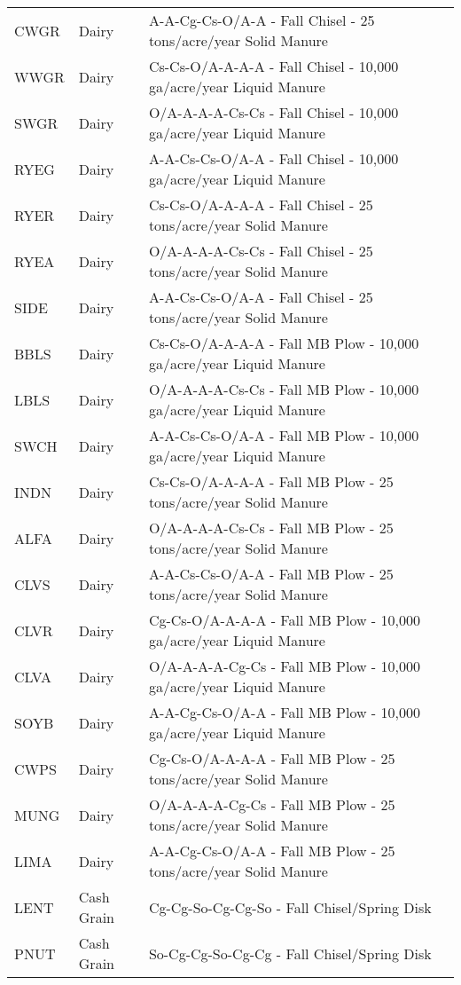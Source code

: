 \begin{longtable}{lll}
  CWGR & Dairy & A-A-Cg-Cs-O/A-A - Fall Chisel - 25 tons/acre/year Solid Manure \\ 
  WWGR & Dairy & Cs-Cs-O/A-A-A-A - Fall Chisel - 10,000 ga/acre/year Liquid Manure \\ 
  SWGR & Dairy & O/A-A-A-A-Cs-Cs - Fall Chisel - 10,000 ga/acre/year Liquid Manure \\ 
  RYEG & Dairy & A-A-Cs-Cs-O/A-A - Fall Chisel - 10,000 ga/acre/year Liquid Manure \\ 
  RYER & Dairy & Cs-Cs-O/A-A-A-A - Fall Chisel - 25 tons/acre/year Solid Manure \\ 
  RYEA & Dairy & O/A-A-A-A-Cs-Cs - Fall Chisel - 25 tons/acre/year Solid Manure \\ 
  SIDE & Dairy & A-A-Cs-Cs-O/A-A - Fall Chisel - 25 tons/acre/year Solid Manure \\ 
  BBLS & Dairy & Cs-Cs-O/A-A-A-A - Fall MB Plow - 10,000 ga/acre/year Liquid Manure \\ 
  LBLS & Dairy & O/A-A-A-A-Cs-Cs - Fall MB Plow - 10,000 ga/acre/year Liquid Manure \\ 
  SWCH & Dairy & A-A-Cs-Cs-O/A-A - Fall MB Plow - 10,000 ga/acre/year Liquid Manure \\ 
  INDN & Dairy & Cs-Cs-O/A-A-A-A - Fall MB Plow - 25 tons/acre/year Solid Manure \\ 
  ALFA & Dairy & O/A-A-A-A-Cs-Cs - Fall MB Plow - 25 tons/acre/year Solid Manure \\ 
  CLVS & Dairy & A-A-Cs-Cs-O/A-A - Fall MB Plow - 25 tons/acre/year Solid Manure \\ 
  CLVR & Dairy & Cg-Cs-O/A-A-A-A - Fall MB Plow - 10,000 ga/acre/year Liquid Manure \\ 
  CLVA & Dairy & O/A-A-A-A-Cg-Cs - Fall MB Plow - 10,000 ga/acre/year Liquid Manure \\ 
  SOYB & Dairy & A-A-Cg-Cs-O/A-A - Fall MB Plow - 10,000 ga/acre/year Liquid Manure \\ 
  CWPS & Dairy & Cg-Cs-O/A-A-A-A - Fall MB Plow - 25 tons/acre/year Solid Manure \\ 
  MUNG & Dairy & O/A-A-A-A-Cg-Cs - Fall MB Plow - 25 tons/acre/year Solid Manure \\ 
  LIMA & Dairy & A-A-Cg-Cs-O/A-A - Fall MB Plow - 25 tons/acre/year Solid Manure \\ 
  LENT & Cash Grain & Cg-Cg-So-Cg-Cg-So - Fall Chisel/Spring Disk \\ 
  PNUT & Cash Grain & So-Cg-Cg-So-Cg-Cg - Fall Chisel/Spring Disk \\ 

\end{longtable}
